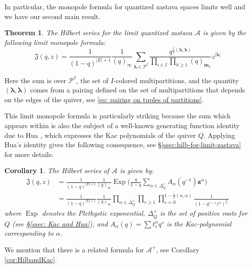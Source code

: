 \documentclass[11pt,reqno]{amsart}
\renewcommand{\mathbf}{\mathbold}
\numberwithin{equation}{section}
\newtheorem{Theorem}[equation]{Theorem}
\newtheorem{Corollary}[equation]{Corollary}
\theoremstyle{definition}
\newcommand{\cA}{\mathcal{A}}
\newcommand{\fJ}{\mathfrak{J}}
\newcommand{\cP}{\mathcal{P}}
\newcommand{\bm}{\mathbf{m}}
\newcommand{\bz}{\mathbf{z}}
\newcommand{\quiver}{Q}
\newcommand{\vertexset}{I}
\newcommand{\arrowset}{E}
\newcommand{\Partitions}{\cP}
\newcommand{\bla}{{\boldsymbol{\lambda}}}
\newcommand{\qzast}{\cA}
\newcommand{\qzastplus}{\cA^{+}}
\begin{document}
In particular, the monopole formula for quantized zastava spaces limits well and we have our second main result.

\begin{Theorem}
  The Hilbert series for the limit quantized zastava $\qzast$ is given by the following limit monopole formula:
  \begin{equation}
    \label{eq:61}
        \fJ(q,z) =  \frac{1}{(1-q)^{|\arrowset|+1}}  \frac{1}{(q)_{\boldsymbol{\infty}}}\sum_{\bla \in \Partitions^\vertexset} \frac{q^{\frac{1}{2}(\bla, \bla)}}{\prod_{i\in \vertexset} \prod_{k\geq 1} (q)_{\bm_k} }z^{|\bla|}  
  \end{equation}
\end{Theorem}
Here the sum is over $\cP^\vertexset$, the set of $I$-colored multipartitions, and the quantity $(\bla,\bla)$ comes from a pairing defined on the set of multipartitions that depends on the edges of the quiver, see \eqref{eq: pairing on tuples of partitions}.

This limit monopole formula is particularly striking because the sum which appears within is also the subject of a well-known generating function identity due to Hua \cite[Theorem 4.9]{Hua}, which expresses the Kac polynomials of the quiver $\quiver$.  Applying Hua's identity gives the following consequence, see \S \ref{ssec:hilb-for-limit-zastava} for more details:
\begin{Corollary}
    The Hilbert series of $\qzast$ is given by:
    \begin{align*}
        \fJ(q,z) &=  \frac{1}{(1-q)^{|\arrowset|+1}}  \frac{1}{(q)_{\boldsymbol{\infty}}} \operatorname{Exp}\Bigg( \frac{q}{1-q}\sum_{\alpha\in \Delta_\quiver^+} A_\alpha(q^{-1}) \bz^\alpha \Bigg) \\
        & = \frac{1}{(1-q)^{|\arrowset|+1}}  \frac{1}{(q)_{\boldsymbol{\infty}}} \prod_{\alpha \in \Delta_Q^+} \prod_{r\geq 1} \prod_{s=0}^{1 - \frac{1}{2} (\alpha,\alpha)} \frac{1}{( 1 -  q^{r-s} z^\alpha)^{t_s^\alpha}}
    \end{align*}
    where $\operatorname{Exp}$ denotes the Plethystic exponential, $\Delta_\quiver^+$ is the set of positive roots for $\quiver$ (see \S\ref{ssec: Kac and Hua}), and $A_\alpha(q) = \sum t^\alpha_s q^s$ is the Kac-polynomial corresponding to $\alpha$.
\end{Corollary}
We mention that there is a related formula for $\qzastplus$, see Corollary \ref{cor:HilbandKac}. 

\end{document}
